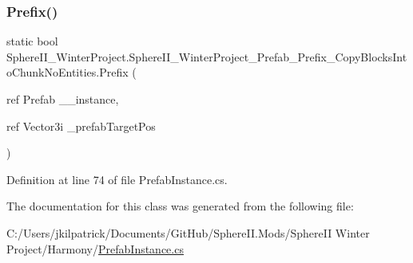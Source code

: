 \subsubsection{\texorpdfstring{Prefix()}{Prefix()}}
{\footnotesize\ttfamily static bool Sphere\+I\+I\+\_\+\+Winter\+Project.\+Sphere\+I\+I\+\_\+\+Winter\+Project\+\_\+\+Prefab\+\_\+\+Prefix\+\_\+\+Copy\+Blocks\+Into\+Chunk\+No\+Entities.\+Prefix (\begin{DoxyParamCaption}\item[{ref Prefab}]{\+\_\+\+\_\+instance,  }\item[{ref Vector3i}]{\+\_\+prefab\+Target\+Pos }\end{DoxyParamCaption})\hspace{0.3cm}{\ttfamily [static]}}



Definition at line 74 of file Prefab\+Instance.\+cs.



The documentation for this class was generated from the following file\+:\begin{DoxyCompactItemize}
\item 
C\+:/\+Users/jkilpatrick/\+Documents/\+Git\+Hub/\+Sphere\+I\+I.\+Mods/\+Sphere\+I\+I Winter Project/\+Harmony/\mbox{\hyperlink{_prefab_instance_8cs}{Prefab\+Instance.\+cs}}\end{DoxyCompactItemize}
